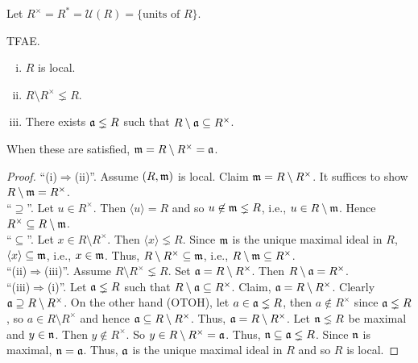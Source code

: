 \begin{notation}
    Let $R^\times = R^* =  \mathcal U(R) = \{\text{units of }R\}$.
\end{notation}

\begin{proposition}
    TFAE.
    \begin{enumerate}[(i)]
        \item $R$ is local.
        \item $R \setminus R^\times \lneq R$.
        \item There exists $\mathfrak{a} \lneq R$ such that $R \setminus \mathfrak{a} \subseteq R^\times$.
    \end{enumerate}
    When these are satisfied, $\mathfrak{m} = R \setminus R^\times = \mathfrak{a}$.
\end{proposition}

\begin{proof}
    ``(i)$\Rightarrow$(ii)''. Assume $(R,\mathfrak{m})$ is local. Claim $\mathfrak{m} = R \setminus R^\times$. It suffices to show $R \setminus \mathfrak{m} = R^\times$. \\
    ``$\supseteq$''. Let $u \in R^\times$. Then $\langle u \rangle = R$ and so $u \not \in \mathfrak{m} \lneq R$, i.e., $u \in R \setminus \mathfrak{m}$. Hence $R^\times \subseteq R \setminus \mathfrak{m}$. \\
    ``$\subseteq$''. Let $x \in R \setminus R^\times$. Then $\langle x \rangle \lneq R$. Since $\mathfrak{m}$ is the unique maximal ideal in $R$, $\langle x \rangle \subseteq \mathfrak{m}$, i.e., $x \in \mathfrak{m}$. Thus, $R \setminus R^\times \subseteq \mathfrak{m}$, i.e., $R \setminus \mathfrak{m} \subseteq R^\times$. \\
    ``(ii)$\Rightarrow$(iii)''. Assume $R \setminus R^\times \lneq R$. Set $\mathfrak{a} = R \setminus R^\times$. Then $R \setminus \mathfrak{a} = R^\times$. \\
    ``(iii)$\Rightarrow$(i)''. Let $\mathfrak{a} \lneq R$ such that $R \setminus \mathfrak{a} \subseteq R^\times $. Claim, $\mathfrak{a} = R \setminus R^\times$. Clearly $\mathfrak{a} \supseteq R \setminus R^\times$. On the other hand (OTOH), let $a \in \mathfrak{a} \lneq R$, then $a \not \in R^\times$ since $\mathfrak{a} \lneq R$, so $a \in R \setminus R^\times$ and hence $\mathfrak{a} \subseteq R \setminus R^\times$. Thus, $\mathfrak{a} = R \setminus R^\times$. Let $\mathfrak{n} \lneq R$ be maximal and $y \in \mathfrak{n}$. Then $y \not \in R^\times$. So $y \in R \setminus R^\times = \mathfrak{a}$. Thus, $\mathfrak{n} \subseteq \mathfrak{a} \lneq R$. Since $\mathfrak{n}$ is maximal, $\mathfrak{n} = \mathfrak{a}$. Thus, $\mathfrak{a}$ is the unique maximal ideal in $R$ and so $R$ is local.
\end{proof}

